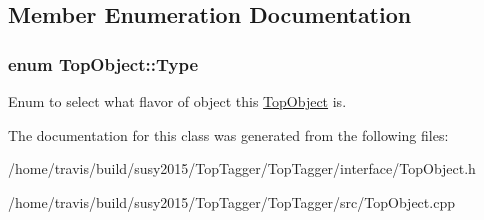 \subsection{Member Enumeration Documentation}
\hypertarget{classTopObject_af82a20e421c29bc667af7cd73fc46ba4}{
\subsubsection[{Type}]{\setlength{\rightskip}{0pt plus 5cm}enum {\bf Top\-Object\-::\-Type}}}\label{classTopObject_af82a20e421c29bc667af7cd73fc46ba4}
Enum to select what flavor of object this \hyperlink{classTopObject}{Top\-Object} is. 

The documentation for this class was generated from the following files\-:\begin{DoxyCompactItemize}
\item 
/home/travis/build/susy2015/\-Top\-Tagger/\-Top\-Tagger/interface/Top\-Object.\-h\item 
/home/travis/build/susy2015/\-Top\-Tagger/\-Top\-Tagger/src/Top\-Object.\-cpp\end{DoxyCompactItemize}
